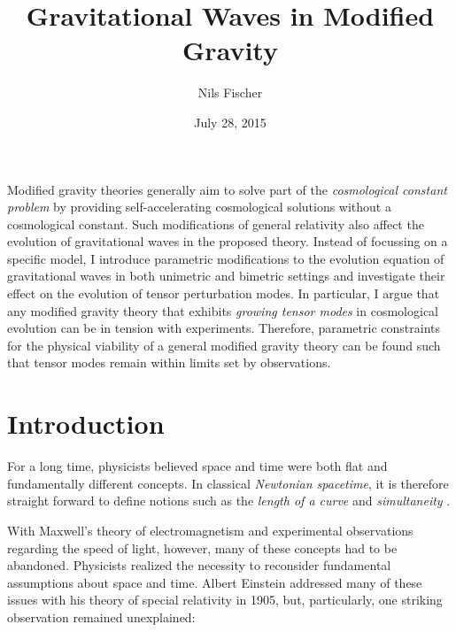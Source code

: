 \documentclass[12pt,parskip=half]{scrreprt}
\title{Gravitational Waves in Modified Gravity}
\author{Nils Fischer}
\date{July 28, 2015}
\begin{document}





\cleardoublepage
\thispagestyle{empty}

Modified gravity theories generally aim to solve part of the \emph{cosmological constant problem} by providing self-accelerating cosmological solutions without a cosmological constant. Such modifications of general relativity also affect the evolution of gravitational waves in the proposed theory. Instead of focussing on a specific model, I introduce parametric modifications to the evolution equation of gravitational waves in both unimetric and bimetric settings and investigate their effect on the evolution of tensor perturbation modes. In particular, I argue that any modified gravity theory that exhibits \emph{growing tensor modes} in cosmological evolution can be in tension with experiments. Therefore, parametric constraints for the physical viability of a general modified gravity theory can be found such that tensor modes remain within limits set by observations.


\cleardoublepage

\tableofcontents


\cleardoublepage{}


\chapter{Introduction}\label{ch:intro}

For a long time, physicists believed space and time were both flat and fundamentally different concepts. In classical \emph{Newtonian spacetime}, it is therefore straight forward to define notions such as the \emph{length of a curve} and \emph{simultaneity} \citep{Tolish}.

With Maxwell's theory of electromagnetism and experimental observations regarding the speed of light, however, many of these concepts had to be abandoned. Physicists realized the necessity to reconsider fundamental assumptions about space and time. Albert Einstein addressed many of these issues with his theory of special relativity  in 1905, but, particularly, one striking observation remained unexplained:
\end{document}
